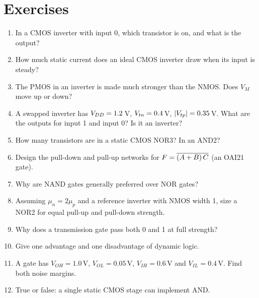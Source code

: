 \section{Exercises}

\begin{enumerate}
  \item In a CMOS inverter with input 0, which transistor is on, and what is the output?
  \item How much static current does an ideal CMOS inverter draw when its input is steady?
  \item The PMOS in an inverter is made much stronger than the NMOS. Does $V_M$ move up or down?
  \item A swapped inverter has $V_{DD} = 1.2$\,V, $V_{tn} = 0.4$\,V, $|V_{tp}| = 0.35$\,V. What are the outputs for input 1 and input 0? Is it an inverter?
  \item How many transistors are in a static CMOS NOR3? In an AND2?
  \item Design the pull-down and pull-up networks for $F = \overline{(A + B)\,C}$ (an OAI21 gate).
  \item Why are NAND gates generally preferred over NOR gates?
  \item Assuming $\mu_n = 2\mu_p$ and a reference inverter with NMOS width 1, size a NOR2 for equal pull-up and pull-down strength.
  \item Why does a transmission gate pass both 0 and 1 at full strength?
  \item Give one advantage and one disadvantage of dynamic logic.
  \item A gate has $V_{OH} = 1.0$\,V, $V_{OL} = 0.05$\,V, $V_{IH} = 0.6$\,V and $V_{IL} = 0.4$\,V. Find both noise margins.
  \item True or false: a single static CMOS stage can implement AND.
\end{enumerate}

